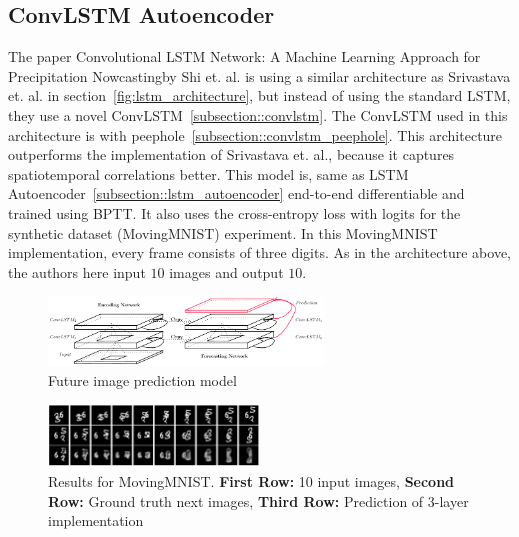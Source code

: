  \subsection{ConvLSTM Autoencoder} \label{subsection::convlstm_autoencoder}
  The paper \glqq Convolutional LSTM Network: A Machine Learning Approach for Precipitation Nowcasting\grqq by Shi et. al. \citep{Shi2015} is using a similar architecture as Srivastava et. al. in
  section~\ref{fig:lstm_architecture}, but instead of using the standard LSTM, they use a novel ConvLSTM~\ref{subsection::convlstm}. The ConvLSTM used in this architecture is with 
  peephole~\ref{subsection::convlstm_peephole}.
  This architecture outperforms the implementation of Srivastava et. al., because it \glqq captures spatiotemporal correlations better\grqq.
  This model is, same as LSTM Autoencoder~\ref{subsection::lstm_autoencoder} end-to-end differentiable and trained using BPTT. It also uses the cross-entropy loss with logits for the synthetic dataset 
  (MovingMNIST) experiment. In this MovingMNIST implementation, every frame consists of three digits. As in the architecture above, the authors here input $10$ images and output $10$.
  \begin{figure}[H]
   \includegraphics[width=0.65\textwidth]{../Images/shi.png}
   \centering
   \caption{Future image prediction model \cite{Shi2015}}
   \label{fig:convlstm_architecture}
  \end{figure}
  \begin{figure}[H]
   \includegraphics[width=0.5\textwidth]{../Images/shi_results_mnist.png}
   \centering
   \caption{Results for MovingMNIST. \textbf{First Row:} 10 input images, \textbf{Second Row:} Ground truth next images, \textbf{Third Row:} Prediction of 3-layer implementation \cite{Shi2015}}
   \label{fig:convlstm_results}
  \end{figure}
 
